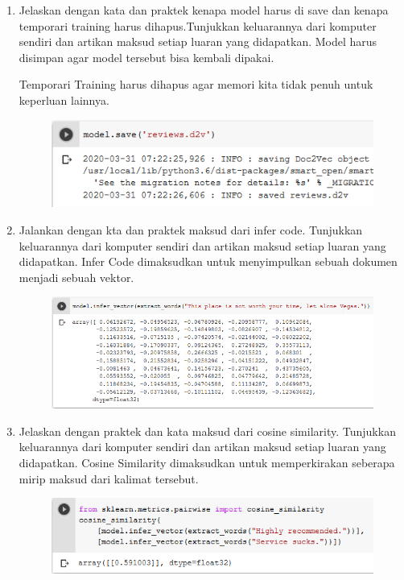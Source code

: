 \begin{enumerate}
	\item Jelaskan dengan kata dan praktek kenapa model harus di save dan kenapa temporari training harus dihapus.Tunjukkan keluarannya dari komputer sendiri dan artikan maksud setiap luaran yang didapatkan.
	\hfill\break
	Model harus disimpan agar model tersebut bisa kembali dipakai.
	
	\hfill\break
	Temporari Training harus dihapus agar memori kita tidak penuh untuk keperluan lainnya.
	
	\hfill\break
	\begin{figure}[H]
	\centering
		\includegraphics[width=8 cm]{figures/1174006/chapter5/soalpraktek/save.PNG}
	\end{figure}
	\item Jalankan dengan kta dan praktek maksud dari infer code. Tunjukkan keluarannya dari komputer sendiri dan artikan maksud setiap luaran yang didapatkan.
	\hfill\break
	Infer Code dimaksudkan untuk menyimpulkan sebuah dokumen menjadi sebuah vektor.
	
	\hfill\break
	\begin{figure}[H]
	\centering
		\includegraphics[width=8 cm]{figures/1174006/chapter5/soalpraktek/infen.PNG}
	\end{figure}

	\item Jelaskan dengan praktek dan kata maksud dari cosine similarity. Tunjukkan keluarannya dari komputer sendiri dan artikan maksud setiap luaran yang didapatkan.
	\hfill\break
	Cosine Similarity dimaksudkan untuk memperkirakan seberapa mirip maksud dari kalimat tersebut.
	
	\hfill\break
	\begin{figure}[H]
	\centering
		\includegraphics[width=8 cm]{figures/1174006/chapter5/soalpraktek/consine.PNG}
	\end{figure}


\end{enumerate}
